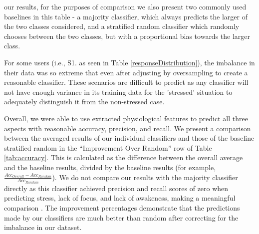  our results, for the purposes of comparison\rev{,} we also present two commonly used baselines in this table - a majority classifier, which always predicts the larger of the two classes considered, and a stratified random classifier which randomly chooses between the two classes, but with a proportional bias towards the larger class.

For some users (i.e., S1. as seen in Table \ref{responseDistribution}), the imbalance in their data was so extreme that even after adjusting by oversampling to create a reasonable classifier. These scenarios are difficult to predict\rev{,} as any classifier will not have enough variance in its training data for the 'stressed' situation to adequately distinguish it from the non-stressed case.




Overall, we were able to use extracted physiological features to
predict all three aspects with reasonable accuracy, precision, and
recall. We present a comparison between the averaged results of our individual classifiers and those of the baseline stratified random  in the ``Improvement Over Random'' row of Table \ref{tab:accuracy}. This is calculated as the difference between the overall average and the baseline results, divided by the baseline results (for example, $\frac{Acc_{Overall} - Acc_{Random}}{Acc_{Random}}$). We do not compare our results with the majority classifier directly as this classifier achieved precision and recall scores of zero when predicting stress, lack of focus, and lack of awakeness, making a meaningful comparison . The improvement percentages demonstrate that the predictions made by our classifiers are much better than random after correcting for the imbalance in our dataset.

